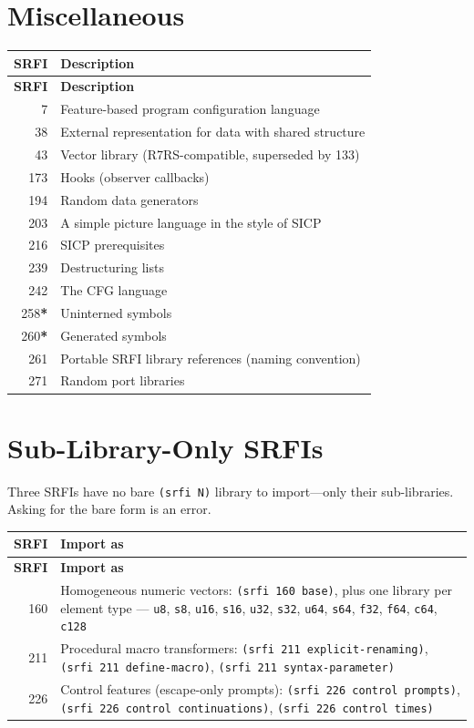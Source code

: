 \section{Miscellaneous}

\begin{longtable}{rp{9cm}}
\textbf{SRFI} & \textbf{Description} \\
\hline
\endfirsthead
\textbf{SRFI} & \textbf{Description} \\
\hline
\endhead
7 & Feature-based program configuration language \\
38 & External representation for data with shared structure \\
43 & Vector library (R7RS-compatible, superseded by 133) \\
173 & Hooks (observer callbacks) \\
194 & Random data generators \\
203 & A simple picture language in the style of SICP \\
216 & SICP prerequisites \\
239 & Destructuring lists \\
242 & The CFG language \\
258\textbf{*} & Uninterned symbols \\
260\textbf{*} & Generated symbols \\
261 & Portable SRFI library references (naming convention) \\
271 & Random port libraries \\
\end{longtable}

\section{Sub-Library-Only SRFIs}

Three SRFIs have no bare \texttt{(srfi N)} library to import---only their
sub-libraries. Asking for the bare form is an error.

\begin{longtable}{rp{9cm}}
\textbf{SRFI} & \textbf{Import as} \\
\hline
\endfirsthead
\textbf{SRFI} & \textbf{Import as} \\
\hline
\endhead
160 & Homogeneous numeric vectors: \texttt{(srfi 160 base)}, plus one library per element type --- \texttt{u8}, \texttt{s8}, \texttt{u16}, \texttt{s16}, \texttt{u32}, \texttt{s32}, \texttt{u64}, \texttt{s64}, \texttt{f32}, \texttt{f64}, \texttt{c64}, \texttt{c128} \\
211 & Procedural macro transformers: \texttt{(srfi 211 explicit-renaming)}, \texttt{(srfi 211 define-macro)}, \texttt{(srfi 211 syntax-parameter)} \\
226 & Control features (escape-only prompts): \texttt{(srfi 226 control prompts)}, \texttt{(srfi 226 control continuations)}, \texttt{(srfi 226 control times)} \\
\end{longtable}
